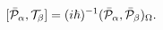 \begin{equation}
\lbrack\bar{{\cal P}}_{\alpha},{\cal T}_{\beta}]=(i\hbar)^{-1}
(\bar{{\cal P}}_{\alpha},\bar{{\cal P}}_{\beta})_{\Omega}.\label{2.14}
\end{equation}

